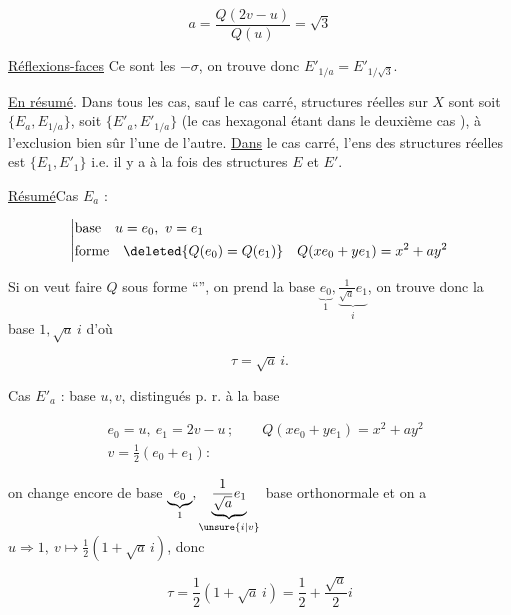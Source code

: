 \[
a=\frac{Q(2v-u)}{Q(u)}=\sqrt{3}
\]

\uline{Réflexions-faces} Ce sont les $-\sigma$, on trouve donc $E'_{1/a}=E'_{1/\sqrt{3}}$.

\uline{En résumé}. Dans tous les cas, sauf le cas carré,     structures réelles sur $X$ sont soit  $\{E_a,E_{1/a}\}$,  soit $\{E'_a,E'_{1/a}\}$  (le cas hexagonal étant dans le deuxième cas ), à l'exclusion bien sûr l'une de l'autre. \uline{Dans} le cas carré, l'ens des structures réelles est $\{E_1,E'_1\}$ i.e. il y a à la fois des structures $E$ et $E'$.


\uline{Résumé}\quad Cas $E_a$ :

\[
\left|\begin{aligned}
&\text{base}\quad u=e_0,\ v=e_1\\
&\text{forme}\quad\deleted{Q(e_0)=Q(e_1)}\quad Q(xe_0+ye_1)=x^2+ay^2
\end{aligned}\right.
\]

Si on veut  faire $Q$ sous forme ``'', on prend la  base $\underbrace{e_0}_{1},\underbrace{\frac{1}{\sqrt a}e_1}_{i}$, on trouve donc la base $1,\sqrt a\,i$ d'où

\[
\boxed{\tau=\sqrt a\,i}.
\]

Cas $E'_a$ : base $u,v$,   distingués p. r. à la base

\[
\begin{aligned}
&e_0=u,\ e_1=2v-u\,;\qquad Q(xe_0+ye_1)=x^2+ay^2\\
&v=\tfrac12(e_0+e_1):
\end{aligned}
\]

on  change encore de base $\underbrace{e_0}_{1},\underbrace{\frac{1}{\sqrt a}e_1}_{\unsure{i|v}}$ base orthonormale et on a $u\Rightarrow1,\ v\longmapsto\frac12(1+\sqrt a\,i)$, donc

\[
\boxed{\tau=\frac12(1+\sqrt a\,i)}=\frac12+\frac{\sqrt a}{2}i
\]


